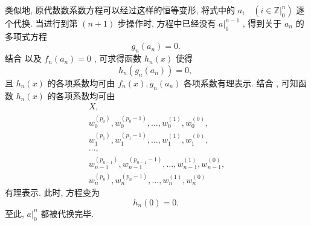 \documentclass{article}
\renewcommand\.{.\hspace{3pt}}
\renewcommand\,{,\hspace{4pt}}
\renewcommand\:{:\hspace{3pt}}
\begin{document}
	类似地\, 原代数数系数方程可以经过这样的恒等变形\, 将式中的 $a_{i} \quad \left( i \in \mathbb{Z} |_{0}^{n} \right)$ 逐个代换\. 当进行到第 $\left( n+1 \right)$ 步操作时\, 方程中已经没有 $a |_{0}^{n-1}$ \, 得到关于 $a_{n}$ 的多项式方程 $$g_{n} \left( a_{n} \right) = 0 \. $$ 结合 \underline{} 以及 $f_{n} \left( a_{n} \right) = 0$ \, 可求得函数 $h_{n} (x)$ 使得 $$h_{n} \left( g_{n} \left( a_{n} \right) \right) = 0 \,$$ 且 $h_{n} (x)$ 的各项系数均可由 $f_{n} (x) , g_{n} \left( a_{n} \right)$ 各项系数有理表示\. 结合 \underline{} \, 可知函数 $h_{n} (x)$ 的各项系数均可由
	\begin{equation}
		\begin{array}{l}
		X , \\
		w_{0}^{\left( p_{0} \right)} , w_{0}^{\left( p_{0}-1 \right)} , \ldots , w_{0}^{\left( 1 \right)} , w_{0}^{\left( 0 \right)} , \\
		w_{1}^{\left( p_{1} \right)} , w_{1}^{\left( p_{1}-1 \right)} , \ldots , w_{1}^{\left( 1 \right)} , w_{1}^{\left( 0 \right)} , \\
		\ldots , \\
		w_{n-1}^{\left( p_{n-1} \right)} , w_{n-1}^{\left( p_{n-1}-1 \right)} , \ldots , w_{n-1}^{\left( 1 \right)} , w_{n-1}^{\left( 0 \right)} , \\
		w_{n}^{\left( p_{n} \right)} , w_{n}^{\left( p_{n}-1 \right)} , \ldots , w_{n}^{\left( 1 \right)} , w_{n}^{\left( 0 \right)}
		\end{array}
	\end{equation}
	有理表示\. 此时\, 方程变为
	\begin{equation} \label{eqn:9}
		h_{n} \left( 0 \right) = 0 \.
	\end{equation}
	至此\, $a |_{0}^{n}$ 都被代换完毕\.
	
\end{document}
